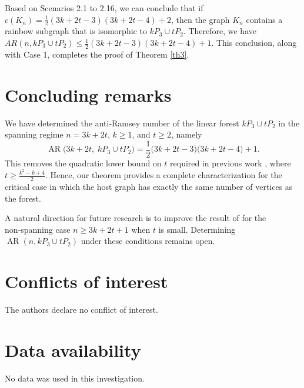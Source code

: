 \documentclass[12pt]{article}
\begin{document}
Based on Scenarios 2.1 to 2.16, we can conclude that if \( c(K_n) = \frac{1}{2}(3k + 2t - 3)(3k + 2t - 4) + 2 \), then the graph \( K_n \) contains a rainbow subgraph that is isomorphic to \( kP_3 \cup tP_2 \). Therefore, we have \( AR(n, kP_3 \cup tP_2) \leq \frac{1}{2}(3k + 2t - 3)(3k + 2t - 4) + 1 \). This conclusion, along with Case 1, completes the proof of Theorem \ref{th3}.

\section{Concluding remarks}

We have determined the anti‑Ramsey number of the linear forest \(kP_{3}\cup tP_{2}\) in the spanning regime $n = 3k+2t$, $k\ge 1$, and $t\ge 2$, namely
\[
\operatorname{AR}\bigl(3k+2t,\; kP_{3}\cup tP_{2}\bigr) = \frac12\bigl(3k+2t-3\bigr)\bigl(3k+2t-4\bigr)+1.
\]
This removes the quadratic lower bound on \(t\) required in previous work \cite{new-1}, where \(t\ge \frac{k^{2}-k+4}{2}\). Hence, our theorem provides a complete characterization for the critical case in which the host graph has exactly the same number of vertices as the forest.

A natural direction for future research is to improve the result of \cite{p1-10} for the non‑spanning case \(n\ge 3k+2t+1\) when \(t\) is small. Determining \(\operatorname{AR}(n,kP_{3}\cup tP_{2})\) under these conditions remains open.



\section*{Conflicts of interest} 

The authors declare no conflict of interest.

\section*{Data availability} 

No data was used in this investigation.
\end{document}
